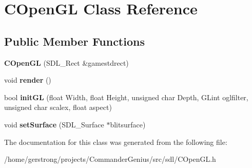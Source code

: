 \hypertarget{class_c_open_g_l}{
\section{COpenGL Class Reference}
\label{class_c_open_g_l}
}
\subsection*{Public Member Functions}
\begin{DoxyCompactItemize}
\item 
\hypertarget{class_c_open_g_l_a6569249854c62b5333fcd61294a98770}{
{\bfseries COpenGL} (SDL\_\-Rect \&gamestdrect)}
\label{class_c_open_g_l_a6569249854c62b5333fcd61294a98770}

\item 
\hypertarget{class_c_open_g_l_a92256b21b74354774b270d46d9b40c74}{
void {\bfseries render} ()}
\label{class_c_open_g_l_a92256b21b74354774b270d46d9b40c74}

\item 
\hypertarget{class_c_open_g_l_a878a4828a41eafe7500302f13637871a}{
bool {\bfseries initGL} (float Width, float Height, unsigned char Depth, GLint oglfilter, unsigned char scalex, float aspect)}
\label{class_c_open_g_l_a878a4828a41eafe7500302f13637871a}

\item 
\hypertarget{class_c_open_g_l_acec4feaac1a6c932298225307e64dfc4}{
void {\bfseries setSurface} (SDL\_\-Surface $\ast$blitsurface)}
\label{class_c_open_g_l_acec4feaac1a6c932298225307e64dfc4}

\end{DoxyCompactItemize}


The documentation for this class was generated from the following file:\begin{DoxyCompactItemize}
\item 
/home/gerstrong/projects/CommanderGenius/src/sdl/COpenGL.h\end{DoxyCompactItemize}
